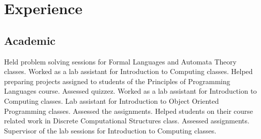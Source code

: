 \documentclass[11pt,a4paper,sans]{moderncv}
\begin{document}
\normalsize

\vspace{4ex}

\fi

\section{Experience}
\subsection{Academic}
	{}{Held problem solving sessions for Formal Languages and Automata Theory classes.}
	{}{Worked as a lab assistant for Introduction to Computing classes.}
	{}{Helped preparing projects assigned to students of the Principles of Programming Languages course. Assessed quizzez.}
	{}{Worked as a lab assistant for Introduction to Computing classes.}
	{}{Lab assistant for Introduction to Object Oriented Programming classes. Assessed the assignments.}
	{}{Helped students on their course related work in Discrete Computational Structures class. Assessed assignments.}
	{}{Supervisor of the lab sessions for Introduction to Computing classes.}
\end{document}
